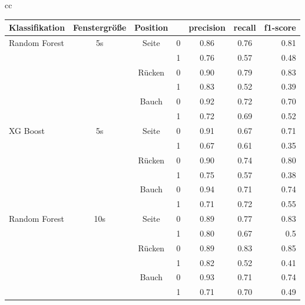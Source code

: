 \begin{table}
  \begin{tabular} {cc}
    \begin{minipage}{1\linewidth}
      \begin{center}
          \begin{tabular}{ | l | c | c | c | c | c | r | }
            \hline
            Klassifikation & Fenstergröße & Position & & precision & recall & f1-score \\ \hline
            Random Forest & 5s & Seite & 0 & 0.86 & 0.76 & 0.81 \\ 
                          &    &       & 1 & 0.76 & 0.57 & 0.48 \\ \hline
                          &    & Rücken& 0 & 0.90 & 0.79 & 0.83 \\ 
                          &    &       & 1 & 0.83 & 0.52 & 0.39 \\ \hline
                          &    & Bauch & 0 & 0.92 & 0.72 & 0.70 \\ 
                          &    &       & 1 & 0.72 & 0.69 & 0.52 \\ \hline
            \hline
            XG Boost & 5s & Seite & 0 & 0.91 & 0.67 & 0.71 \\
                     &    &       & 1 & 0.67 & 0.61 & 0.35 \\ \hline
                     &    & Rücken& 0 & 0.90 & 0.74 & 0.80 \\ 
                     &    &       & 1 & 0.75 & 0.57 & 0.38 \\ \hline
                     &    & Bauch & 0 & 0.94 & 0.71 & 0.74 \\ 
                     &    &       & 1 & 0.71 & 0.72 & 0.55 \\ \hline
            \hline
            Random Forest & 10s & Seite & 0 & 0.89 & 0.77 & 0.83 \\ 
                          &     &       & 1 & 0.80 & 0.67 & 0.5 \\ \hline
                          &     & Rücken& 0 & 0.89 & 0.83 & 0.85 \\
                          &     &       & 1 & 0.82 & 0.52 & 0.41 \\ \hline
                          &     & Bauch & 0 & 0.93 & 0.71 & 0.74 \\
                          &     &       & 1 & 0.71 & 0.70 & 0.49 \\ \hline

\end{tabular}
\end{center}
\end{minipage}
\end{tabular}
\end{table}
